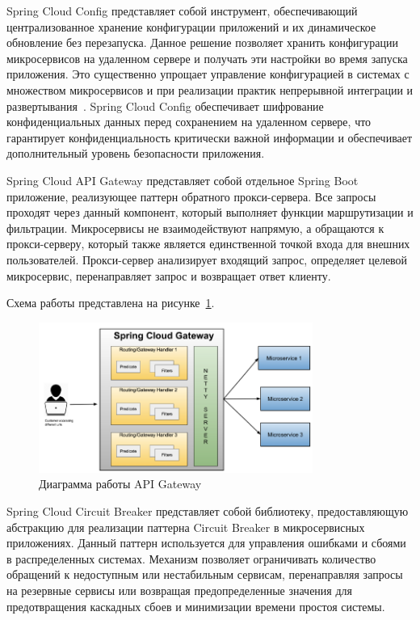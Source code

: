 Spring Cloud Config представляет собой инструмент, обеспечивающий централизованное хранение конфигурации приложений и их динамическое обновление без перезапуска.
Данное решение позволяет хранить конфигурации микросервисов на удаленном сервере и получать эти настройки во время запуска приложения. Это существенно упрощает управление конфигурацией в системах с множеством микросервисов и при реализации практик непрерывной интеграции и развертывания~\cite{13_davis2020}.
Spring Cloud Config обеспечивает шифрование конфиденциальных данных перед сохранением на удаленном сервере, что гарантирует конфиденциальность критически важной информации и обеспечивает дополнительный уровень безопасности приложения.

Spring Cloud API Gateway представляет собой отдельное Spring Boot приложение, реализующее паттерн обратного прокси-сервера.
Все запросы проходят через данный компонент, который выполняет функции маршрутизации и фильтрации.
Микросервисы не взаимодействуют напрямую, а обращаются к прокси-серверу, который также является единственной точкой входа для внешних пользователей. Прокси-сервер анализирует входящий запрос, определяет целевой микросервис, перенаправляет запрос и возвращает ответ клиенту.

Схема работы представлена на рисунке~\ref{fig:api_gateway}.

\begin{figure}[htbp]
    \centering
    \includegraphics[width=0.8\textwidth]{Dissertation/images/api_gateway}
    \caption{Диаграмма работы API Gateway}
    \label{fig:api_gateway}
\end{figure}

Spring Cloud Circuit Breaker представляет собой библиотеку, предоставляющую абстракцию для реализации паттерна Circuit Breaker в микросервисных приложениях.
Данный паттерн используется для управления ошибками и сбоями в распределенных системах. Механизм позволяет ограничивать количество обращений к недоступным или нестабильным сервисам, перенаправляя запросы на резервные сервисы или возвращая предопределенные значения для предотвращения каскадных сбоев и минимизации времени простоя системы.

